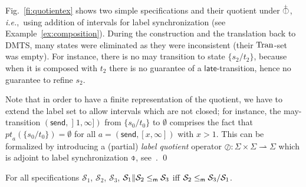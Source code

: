 \documentclass[twocolumn]{svjour3-dummy}
\newcommand*\ie{\textit{i.e.},}
\newcommand*\parto{\rightharpoonup}
\newcommand*\obarplus{\mathbin{\overset{\scriptscriptstyle +}{\raisebox{0pt}[1.1ex][0pt]{$\obar$}}}}
\newcommand*\mr{\le_\textup{\textsf{m}}}
\newcommand*\Tran{\textup{\textrm{Tran}}}
\newcommand*\cS{\mathcal S}
\newcommand*\by{/}
\newcommand*\postra[2][]{\textit{pt}_{#1}(#2)}
\newcommand*\send{\textsf{send}}
\newcommand*\late{\textsf{late}}
\begin{document}
\begin{example}
  Fig.~\ref{fi:quotientex} shows two simple specifications and their
  quotient under $\obarplus$, \ie~using addition of intervals for
  label synchronization (see Example~\ref{ex:composition}).  During
  the construction and the translation back to DMTS, many states were
  eliminated as they were inconsistent (their $\Tran$-set was
  empty). For instance, there is no may transition to state
  $\{s_2/t_2\}$, because when it is composed with $t_2$ there is no
  guarantee of a $\late$-transition, hence no guarantee to refine
  $s_2$.

  Note that in order to have a finite representation of the quotient,
  we have to extend the label set to allow intervals which are not
  closed; for instance, the may-transition $( \send,\mathopen] 1,
  \infty])$ from $\{ s_0\by t_0\}$ to $\emptyset$ comprises the fact
  that $\postra[ a]{\{ s_0\by t_0\}}= \emptyset$ for all $a=( \send,[
  x, \infty])$ with $x> 1$.  This can be formalized by introducing a
  (partial) \emph{label quotient} operator $\mathord{\oslash}:
  \Sigma\times \Sigma\parto \Sigma$ which is adjoint to label
  synchronization $\obar$,
  see~\cite{DBLP:journals/acta/FahrenbergL14}. \qed
\end{example}

\begin{theorem}
  \label{th:quotient-bool}
  For all specifications $\cS_1$, $\cS_2$, $\cS_3$, $\cS_1\| \cS_2\mr
  \cS_3$ iff $\cS_2\mr \cS_3\by \cS_1$.
\end{theorem}
\end{document}
